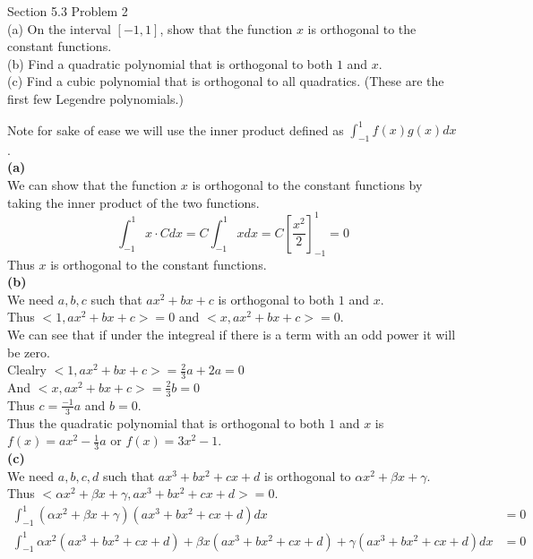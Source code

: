 \documentclass[answers,12pt,addpoints]{exam}
\begin{document}
\begin{questions}
    \question Section 5.3 Problem 2\\
    (a) On the interval \([-1,1]\), show that the function \(x\) is orthogonal to the constant functions.\\
    (b) Find a quadratic polynomial that is orthogonal to both \(1\) and \(x\).\\
    (c) Find a cubic polynomial that is orthogonal to all quadratics. (These are the first few Legendre polynomials.)
    \begin{solution}
        Note for sake of ease we will use the inner product defined as \(\int_{-1}^{1} f(x)g(x)dx\).\\
        \textbf{(a)}\\
        We can show that the function \(x\) is orthogonal to the constant functions by taking the inner product of the two functions.\\
        $$ \int_{-1}^{1} x \cdot C dx = C \int_{-1}^{1} x dx = C \left[ \frac{x^2}{2} \right]_{-1}^{1} = 0$$
        Thus \(x\) is orthogonal to the constant functions.\\
        \textbf{(b)}\\
        We need $a,b,c$ such that $ax^2 + bx + c$ is orthogonal to both $1$ and $x$.\\
        Thus $<1, ax^2 + bx + c> = 0$ and $<x, ax^2 + bx + c> = 0$.\\
        We can see that if under the integreal if there is a term with an odd power it will be zero.\\
        Clealry $<1, ax^2 + bx + c> = \frac{2}{3}a +2a =0 $\\
        And $<x, ax^2 + bx + c> = \frac{2}{3}b = 0$\\
        Thus $c= \frac{-1}{3}a$ and $b = 0$.\\
        Thus the quadratic polynomial that is orthogonal to both \(1\) and \(x\) is $f(x) = ax^2 - \frac{1}{3}a$ or \(f(x) = 3x^2 - 1\).\\
        \textbf{(c)}\\
        We need $a,b,c,d$ such that $ax^3 + bx^2 + cx + d$ is orthogonal to $\alpha x^2 + \beta x + \gamma$.\\
        Thus $<\alpha x^2 + \beta x + \gamma, ax^3 + bx^2 + cx + d> = 0$.\\
        \begin{align*}
            \int_{-1}^{1} (\alpha x^2 + \beta x + \gamma)(ax^3 + bx^2 + cx + d)dx &= 0\\
            \int_{-1}^{1} \alpha x^2(ax^3 + bx^2 + cx + d) + \beta x(ax^3 + bx^2 + cx + d) + \gamma(ax^3 + bx^2 + cx + d)dx &= 0\\

\end{align*}
\end{solution}
\end{questions}
\end{document}
